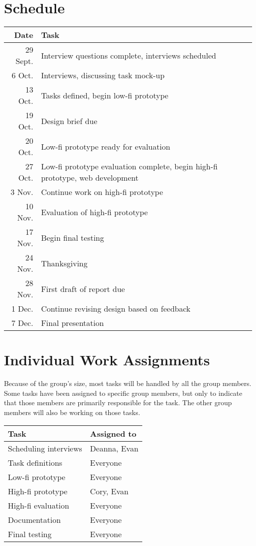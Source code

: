 \documentclass[12pt,titlepage]{article}
\begin{document}
\section{Schedule}
\begin{tabular}[!h]{rl}
	\textbf{Date} & \textbf{Task} \\
	\hline
	29 Sept. & Interview questions complete, interviews scheduled \\
	 6 Oct.  & Interviews, discussing task mock-up \\
	13 Oct.  & Tasks defined, begin low-fi prototype \\
	19 Oct.  & Design brief due \\
	20 Oct.  & Low-fi prototype ready for evaluation \\
	27 Oct.  & Low-fi prototype evaluation complete, begin high-fi prototype,
	           web development \\
	 3 Nov.  & Continue work on high-fi prototype \\
	10 Nov.  & Evaluation of high-fi prototype \\
	17 Nov.  & Begin final testing \\
	24 Nov.  & Thanksgiving \\
	28 Nov.  & First draft of report due \\
	 1 Dec.  & Continue revising design based on feedback \\
	 7 Dec.  & Final presentation
\end{tabular}

\section{Individual Work Assignments}
Because of the group's size, most tasks will be handled by all the group
members. Some tasks have been assigned to specific group members, but only to
indicate that those members are primarily responsible for the task. The other
group members will also be working on those tasks.

\hfill
\linebreak
\begin{tabular}[!h]{ll}
	\textbf{Task}         & \textbf{Assigned to} \\
	\hline
	Scheduling interviews & Deanna, Evan \\
	Task definitions      & Everyone \\
	Low-fi prototype      & Everyone \\
	High-fi prototype     & Cory, Evan \\
	High-fi evaluation    & Everyone \\
	Documentation         & Everyone \\
	Final testing         & Everyone
\end{tabular}
\end{document}
